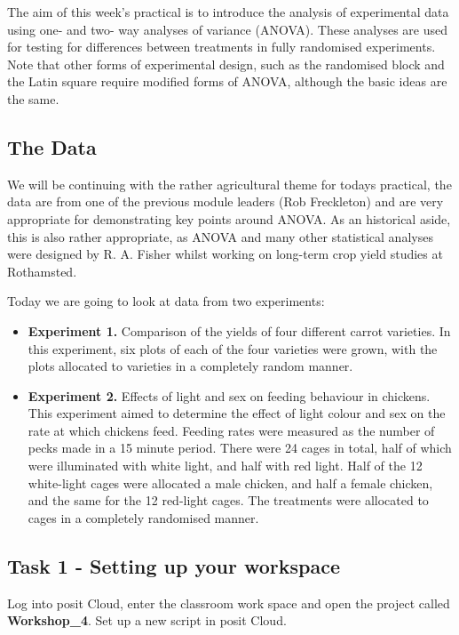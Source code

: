 \documentclass[
]{book}
\providecommand{\tightlist}{%
  \setlength{\itemsep}{0pt}\setlength{\parskip}{0pt}}
\begin{document}
The aim of this week's practical is to introduce the analysis of experimental data using one- and two- way analyses of variance (ANOVA). These analyses are used for testing for differences between treatments in fully randomised experiments. Note that other forms of experimental design, such as the randomised block and the Latin square require modified forms of ANOVA, although the basic ideas are the same.

\subsection{The Data}\label{the-data-1}

We will be continuing with the rather agricultural theme for todays practical, the data are from one of the previous module leaders (Rob Freckleton) and are very appropriate for demonstrating key points around ANOVA. As an historical aside, this is also rather appropriate, as ANOVA and many other statistical analyses were designed by R. A. Fisher whilst working on long-term crop yield studies at Rothamsted.

Today we are going to look at data from two experiments:

\begin{itemize}
\tightlist
\item
  \textbf{Experiment 1.} Comparison of the yields of four different carrot varieties. In this experiment, six plots of each of the four varieties were grown, with the plots allocated to varieties in a completely random manner.
\item
  \textbf{Experiment 2.} Effects of light and sex on feeding behaviour in chickens. This experiment aimed to determine the effect of light colour and sex on the rate at which chickens feed. Feeding rates were measured as the number of pecks made in a 15 minute period. There were 24 cages in total, half of which were illuminated with white light, and half with red light. Half of the 12 white-light cages were allocated a male chicken, and half a female chicken, and the same for the 12 red-light cages. The treatments were allocated to cages in a completely randomised manner.
\end{itemize}

\subsection{Task 1 - Setting up your workspace}\label{task-1---setting-up-your-workspace-1}

Log into posit Cloud, enter the classroom work space and open the project called \textbf{Workshop\_4}. Set up a new script in posit Cloud.
\end{document}
